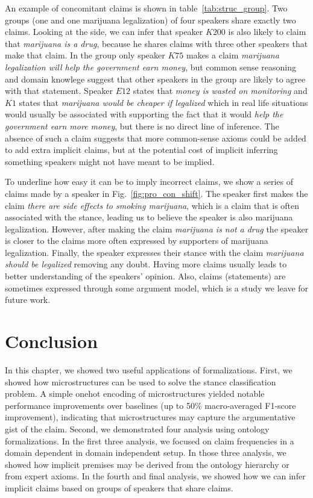 An example of concomitant claims is shown in table~\ref{tab:struc_group}. 
Two groups (one  and one  marijuana legalization)
of four speakers share exactly two claims. Looking at the  side, we
can infer that speaker $K200$ is also likely to claim that \emph{marijuana is a drug}, because
he shares claims with three other speakers that make that claim.
In the  group only speaker $K75$ makes a claim 
\emph{marijuana legalization will help the government earn money}, but
common sense reasoning and domain knowlege suggest that other speakers in the group
are likely to agree with that statement. Speaker $E12$ states 
that \emph{money is wasted on monitoring} and $K1$ states that \emph{
marijuana would be cheaper if legalized} which in real life situations 
would usually be associated with supporting the fact that it would
\emph{help the government earn more money}, but there is no direct line of inference.
The absence of such a claim suggests that more common-sense axioms could be
added to add extra implicit claims, but at the potential cost of 
implicit inferring something speakers might not have meant to be implied. 

To underline how easy it can be to imply incorrect claims, we show a series of
claims made by a speaker in Fig.~\ref{fig:pro_con_shift}.  The speaker first
makes the claim \emph{there are side effects to smoking marijuana}, which is a
claim that is often associated with the  stance, leading us to believe
the speaker is also  marijuana legalization.  However, after
making the claim \emph{marijuana is not a drug} the speaker is closer to the
claims more often expressed by supporters of marijuana legalization.  Finally,
the speaker expresses their  stance with the claim \emph{marijuana
should be legalized} removing any doubt. Having more claims usually leads to
better understanding of the speakers' opinion. Also, claims (statements) are
sometimes expressed through some argument model, which is a study we leave for
future work. 

\section{Conclusion}
\label{sec:struc_conclusion}

In this chapter, we showed two useful applications of formalizations.  First,
we showed how microstructures can be used to solve the stance classification
problem. A simple onehot encoding of microstructures yielded notable
performance improvements over baselines (up to 50\% macro-averaged F1-score
improvement), indicating that microstructures may capture the argumentative
gist of the claim.
Second, we demonstrated four analysis using ontology
formalizations. In the first three analysis, we focused on claim frequencies in a
domain dependent in domain independent setup. In those three analysis, we 
showed how implicit premises may be derived from the ontology hierarchy or from 
expert axioms. In the fourth and final analysis, we 
showed how we can infer implicit claims based on groups of speakers that 
share claims. 

